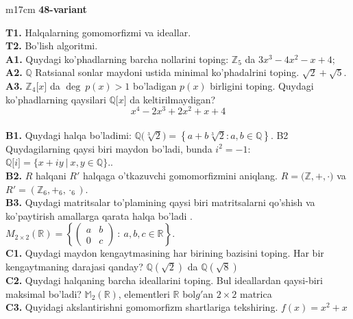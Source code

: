 \documentclass{article}
\begin{document}
\begin{tabular}{m{17cm}}
\textbf{48-variant}
\newline

\textbf{T1.} Halqalarning gomomorfizmi va ideallar. \\
\textbf{T2.} Bo'lish algoritmi. \\
\textbf{A1.} Quydagi ko'phadlarning barcha nollarini toping:
\(\mathbb{Z}_{5}\) da \(3x^{3} - 4x^{2} - x + 4\); \\
\textbf{A2.} \(\mathbb{Q}\) Ratsianal sonlar maydoni ustida minimal ko'phadalrini toping.
\(\sqrt{2} + \sqrt{5}\). \\
\textbf{A3.} \(\mathbb{Z}_{4}\lbrack x\rbrack\) da \(\deg\ p(x) > 1\) bo'ladigan \(p(x)\) birligini toping. Quydagi ko'phadlarning qaysilari \(\mathbb{Q\lbrack}x\rbrack\) da keltirilmaydigan?
\[x^{4} - 2x^{3} + 2x^{2} + x + 4\] \\
\textbf{B1.} Quydagi halqa bo'ladimi:
\(\mathbb{Q(}\sqrt[3]{2}) = \left\{ a + b\sqrt[3]{2}:a,b \in \mathbb{Q} \right\}\).
B2 Quydagilarning qaysi biri maydon bo'ladi, bunda \(i^{2} = - 1\):
\(\mathbb{Q\lbrack}i\rbrack = \{ x + iy\ |\ x,y \in \mathbb{Q\}}\).. \\
\textbf{B2.} \(R\) halqani \(R'\) halqaga o'tkazuvchi gomomorfizmini aniqlang.
\(R\mathbb{= (Z,} + , \cdot )\) va \(R' = (\mathbb{Z}_{6}, +_{6}, \cdot_{6})\). \\
\textbf{B3.} Quydagi matritsalar to'plamining qaysi biri matritsalarni qo'shish va ko'paytirish amallarga qarata halqa bo'ladi .
\(M_{2 \times 2}\mathbb{(R) =}\left\{ \begin{pmatrix}
a & b \\
0 & c
\end{pmatrix}\ :\ a,b,c \in \mathbb{R} \right\}\). \\
\textbf{C1.} Quydagi maydon kengaytmasining har birining bazisini toping. Har bir kengaytmaning darajasi qanday?
\(\mathbb{Q}\left( \sqrt{2} \right)\) da \(\mathbb{Q}\left( \sqrt{8} \right)\) \\
\textbf{C2.} Quydagi halqaning barcha ideallarini toping. Bul ideallardan qaysi-biri maksimal bo'ladi?
\(\mathbb{M}_{2}\left( \mathbb{R} \right)\), elementleri \(\mathbb{R}\) bol\(g'\)an \(2 \times 2\) matrica \\
\textbf{C3.} Quyidagi akslantirishni gomomorfizm shartlariga tekshiring. \(f(x) = x^{2} + x\) \\

\end{tabular}
\vspace{1cm}
\end{document}
